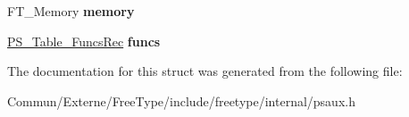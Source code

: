 \begin{DoxyCompactItemize}
\item 
F\+T\+\_\+\+Memory {\bfseries memory}\hypertarget{struct_p_s___table_rec___a061872add9c6d1af67cfdfac5ce2b80d}{}\label{struct_p_s___table_rec___a061872add9c6d1af67cfdfac5ce2b80d}

\item 
\hyperlink{struct_p_s___table___funcs_rec__}{P\+S\+\_\+\+Table\+\_\+\+Funcs\+Rec} {\bfseries funcs}\hypertarget{struct_p_s___table_rec___adced5ad36107c90012e9fafa55eab5b9}{}\label{struct_p_s___table_rec___adced5ad36107c90012e9fafa55eab5b9}

\end{DoxyCompactItemize}


The documentation for this struct was generated from the following file\+:\begin{DoxyCompactItemize}
\item 
Commun/\+Externe/\+Free\+Type/include/freetype/internal/psaux.\+h\end{DoxyCompactItemize}
